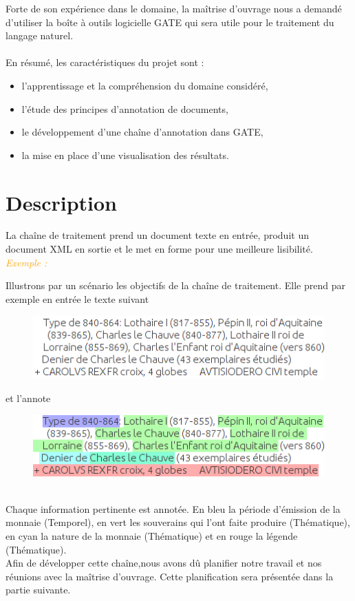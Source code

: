 \documentclass[a4paper, 11pt]{report}
\newenvironment{exemple}
    {
    \textit{\textcolor{orange}{
    Exemple : \\}}
    }
    {~\\
    }
\begin{document}
Forte de son expérience dans le domaine, la maîtrise d'ouvrage nous a demandé d'utiliser la boîte à outils logicielle GATE qui sera utile pour le traitement du langage naturel.\\~\\

En résumé, les caractéristiques du projet sont : 
\begin{itemize}
\item l'apprentissage et la compréhension du domaine considéré,
\item l'étude des principes d'annotation de documents,
\item le développement d'une chaîne d'annotation dans GATE,
\item la mise en place d'une visualisation des résultats.
\end{itemize}

\newpage
    \section{Description}
    La chaîne de traitement prend un document texte en entrée, produit un document XML en sortie et le met en forme pour une meilleure lisibilité.\\
    \begin{exemple}
\noindent Illustrons par un scénario les objectifs de la chaîne de traitement.
Elle prend par exemple en entrée le texte suivant

\begin{figure}[h!]
\centering
\includegraphics[scale=.5]{img/exemple_text.png}
\end{figure}

et l'annote
\end{exemple}
\begin{figure}[h!]
\centering
\includegraphics[scale=.5]{img/exemple_text_ann.png} 
\end{figure}\\
Chaque information pertinente est annotée. En bleu la période d'émission de la monnaie (Temporel), en vert les souverains qui l'ont faite produire (Thématique), en cyan la nature de la monnaie (Thématique) et en rouge la légende (Thématique).\\
Afin de développer cette chaîne,nous avons dû planifier notre travail et nos réunions avec la maîtrise d'ouvrage. Cette planification sera présentée dans la partie suivante.
\end{document}
